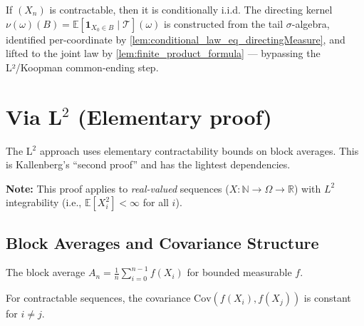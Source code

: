\begin{theorem}
  \label{thm:conditionallyIID_of_contractable_martingale}
  \leanok
  If $(X_n)$ is contractable, then it is conditionally i.i.d.
  The directing kernel $\nu(\omega)(B) = \mathbb{E}[\mathbf{1}_{X_0 \in B} \mid \mathcal{T}](\omega)$
  is constructed from the tail $\sigma$-algebra, identified per-coordinate by
  \ref{lem:conditional_law_eq_directingMeasure}, and lifted to the joint law by
  \ref{lem:finite_product_formula} — bypassing the L²/Koopman common-ending step.
\end{theorem}


\section{\texorpdfstring{Via L$^2$}{Via L²} (Elementary proof)}

The L$^2$ approach uses elementary contractability bounds on block averages.
This is Kallenberg's ``second proof'' and has the lightest dependencies.

\textbf{Note:} This proof applies to \emph{real-valued} sequences ($X : \mathbb{N} \to \Omega \to \mathbb{R}$)
with $L^2$ integrability (i.e., $\mathbb{E}[X_i^2] < \infty$ for all $i$).

\subsection{Block Averages and Covariance Structure}

\begin{definition}
  \label{def:blockAvg_L2}
  \leanok
  The block average $A_n = \frac{1}{n}\sum_{i=0}^{n-1} f(X_i)$ for bounded measurable $f$.
\end{definition}

\begin{lemma}
  \label{lem:covariance_structure}
  \leanok
  For contractable sequences, the covariance $\mathrm{Cov}(f(X_i), f(X_j))$ is constant
  for $i \ne j$.
\end{lemma}


